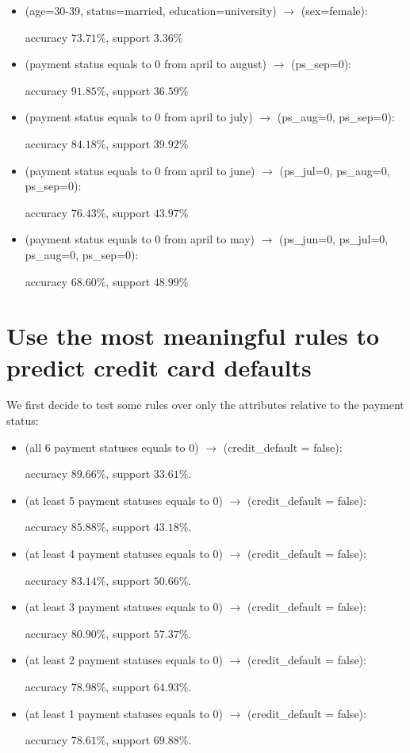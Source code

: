 \begin{itemize}
  \item (age=30-39, status=married, education=university) $\rightarrow$ (sex=female):
  
    \tab accuracy $73.71\%$, support $3.36\%$
  \item (payment status equals to 0 from april to august) $\rightarrow$ (ps\_sep=0):
  
    \tab accuracy $91.85\%$, support $36.59\%$
  \item (payment status equals to 0 from april to july) $\rightarrow$ (ps\_aug=0, ps\_sep=0):
  
    \tab accuracy $84.18\%$, support $39.92\%$

  \item (payment status equals to 0 from april to june) $\rightarrow$ (ps\_jul=0, ps\_aug=0, ps\_sep=0):
  
    \tab accuracy $76.43\%$, support $43.97\%$

  \item (payment status equals to 0 from april to may) $\rightarrow$ (ps\_jun=0, ps\_jul=0, ps\_aug=0, ps\_sep=0):
  
    \tab accuracy $68.60\%$, support $48.99\%$

\end{itemize}

\clearpage

\section{Use the most meaningful rules to predict credit card defaults}

We first decide to test some rules over only the attributes relative to the payment status:

\begin{itemize}
  \item (all 6 payment statuses equals to 0) $\rightarrow$ (credit\_default = false):
  
    \tab accuracy $89.66\%$, support $33.61\%$.
  \item (at least 5 payment statuses equals to 0) $\rightarrow$ (credit\_default = false):
  
    \tab accuracy $85.88\%$, support $43.18\%$.
  \item (at least 4 payment statuses equals to 0) $\rightarrow$ (credit\_default = false):
  
    \tab accuracy $83.14\%$, support $50.66\%$.
  \item (at least 3 payment statuses equals to 0) $\rightarrow$ (credit\_default = false):
  
    \tab accuracy $80.90\%$, support $57.37\%$.
  \item (at least 2 payment statuses equals to 0) $\rightarrow$ (credit\_default = false):
  
    \tab accuracy $78.98\%$, support $64.93\%$.
  \item (at least 1 payment statuses equals to 0) $\rightarrow$ (credit\_default = false):
  
    \tab accuracy $78.61\%$, support $69.88\%$.

\end{itemize} 

